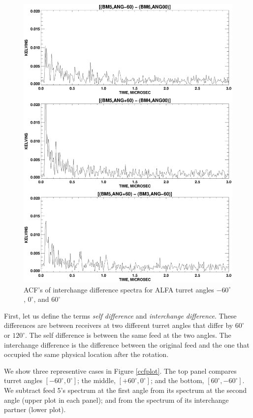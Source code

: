 \documentclass[psfig,preprint]{aastex}
\begin{document}
\begin{figure}[!p]
\begin{center}
\includegraphics[width=6in]{ccfplot_ft.ps}   
\end{center}
\caption{ACF's of interchange difference spectra for ALFA turret 
angles $-60^\circ$, $0^\circ$, and
$60^\circ$\label{ccfplot_ft}}
\end{figure}

	First, let us define the terms {\it self difference} and {\it
interchange difference}. These differences are between receivers at two
different turret angles that differ by $60^\circ$ or $120^\circ$. The
self difference is between the same feed at the two angles. The
interchange difference is the difference between the original feed and
the one that occupied the same physical location after the rotation. 

	We show three representive cases in Figure \ref{ccfplot}.  The
top panel compares turret angles $[-60^\circ, 0^\circ]$; the middle,
$[+60^\circ, 0^\circ]$; and the bottom, $[60^\circ,-60^\circ]$.  We
subtract feed 5's spectrum at the first angle from its spectrum at the
second angle (upper plot in each panel); and from the spectrum of its
interchange partner (lower plot). 
\end{document}
